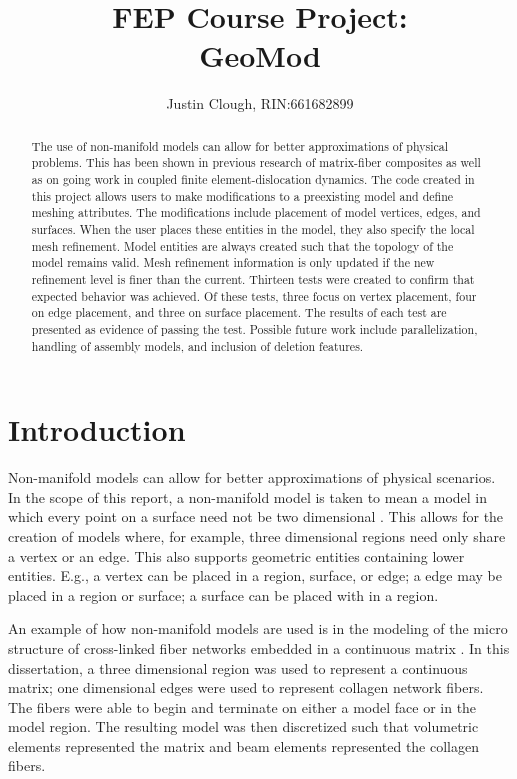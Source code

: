 \documentclass[a4paper, 12pt]{article}
\author{Justin Clough, RIN:661682899}
\title{FEP Course Project: \\
        GeoMod}
\begin{document}
\maketitle

\begin{abstract}
The use of non-manifold models can allow for better approximations of
physical problems.
This has been shown in previous research of matrix-fiber composites
as well as on going work in coupled finite element-dislocation 
dynamics. 
The code created in this project allows users to make 
modifications to a preexisting model and define meshing attributes. 
The modifications include placement of model vertices, edges, and surfaces. 
When the user places these entities in the model, they also 
specify the local mesh refinement.
Model entities are always created such that the topology of the model
remains valid.
Mesh refinement information is only updated if the new refinement
level is finer than the current.
Thirteen tests were created to confirm that expected behavior 
was achieved. 
Of these tests, three focus on vertex placement, 
four on edge placement, and three on surface placement. 
The results of each test are presented as evidence of passing the test. 
Possible future work include parallelization, handling of assembly
models, and inclusion of deletion features.
\end{abstract}

\newpage
\section{Introduction} \label{sec:intro}
Non-manifold models can allow for better approximations 
of physical scenarios. 
In the scope of this report, a non-manifold model is taken to mean 
a model in which every point on a surface need not be 
two dimensional \cite{weiler86}. 
This allows for the creation of models where, for example, three
dimensional regions need only share a vertex or an edge. This also 
supports geometric entities containing lower entities. E.g., a vertex
can be placed in a region, surface, or edge; a edge may be placed in
a region or surface; a surface can be placed with in a region.

An example of how non-manifold models are used is in 
the modeling of the micro structure of cross-linked 
fiber networks embedded in a continuous matrix \cite{zhangThesis}. 
In this dissertation, a three dimensional region was used to represent 
a continuous matrix; one dimensional edges were used to represent collagen 
network fibers. The fibers were able to begin and terminate on either a 
model face or in the model region. The resulting model was then discretized 
such that volumetric elements represented the matrix 
and beam elements represented the collagen fibers.
\end{document}
